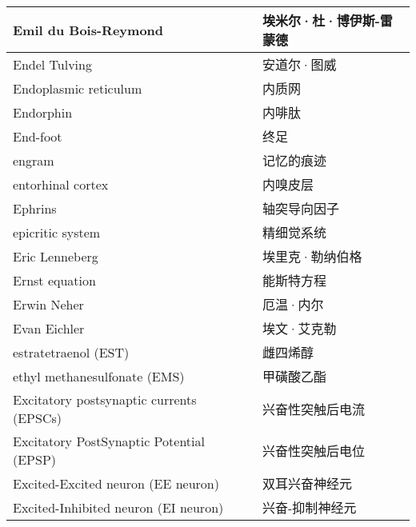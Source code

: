 \begin{longtable}{lll}
	\midrule
	Emil du	Bois-Reymond   &&  埃米尔·杜·博伊斯-雷蒙德  \\
	
	\midrule
	Endel Tulving     &&  安道尔·图威  \\
	
	\midrule
	Endoplasmic reticulum     &&  内质网  \\
	
	\midrule
	Endorphin     &&  内啡肽  \\
	
	\midrule
	End-foot     &&  终足  \\
	
	\midrule
	engram     &&  记忆的痕迹  \\
	
	\midrule
	entorhinal cortex     &&  内嗅皮层  \\
	
	\midrule
	Ephrins     &&  轴突导向因子  \\
	
	\midrule
	epicritic system     &&  精细觉系统  \\
	
	\midrule
	Eric Lenneberg    &&  埃里克·勒纳伯格  \\
	
	\midrule
	Ernst equation    &&  能斯特方程  \\
	
	\midrule
	Erwin Neher    &&  厄温·内尔  \\
	
	\midrule
	Evan Eichler    &&  埃文·艾克勒  \\
	
	\midrule
	estratetraenol (EST)   &&  雌四烯醇  \\
	
	\midrule
	ethyl methanesulfonate (EMS)    &&  甲磺酸乙酯  \\
	
	\midrule
	Excitatory postsynaptic currents (EPSCs)     &&  兴奋性突触后电流  \\
	
	\midrule
	Excitatory PostSynaptic Potential (EPSP)     &&  兴奋性突触后电位  \\
	
	\midrule
	Excited-Excited neuron (EE neuron)     &&  双耳兴奋神经元  \\
	
	\midrule
	Excited-Inhibited neuron (EI neuron)     && 兴奋-抑制神经元   \\
	

\end{longtable}
